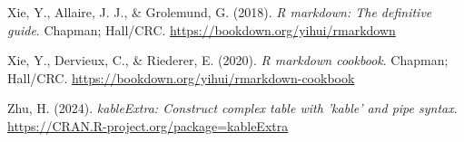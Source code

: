 \documentclass[
  stu]{apa7}
\newlength{\cslhangindent}
\newenvironment{CSLReferences}[2] %
 {\begin{list}{}{%
  \setlength{\itemindent}{0pt}
  \setlength{\leftmargin}{0pt}
  \setlength{\parsep}{0pt}
  \ifodd #1
   \setlength{\leftmargin}{\cslhangindent}
   \setlength{\itemindent}{-1\cslhangindent}
  \fi
  \setlength{\itemsep}{#2\baselineskip}}}
 {\end{list}}
\begin{document}
\begin{CSLReferences}{1}{0}
Xie, Y., Allaire, J. J., \& Grolemund, G. (2018). \emph{R markdown: The definitive guide}. Chapman; Hall/CRC. \url{https://bookdown.org/yihui/rmarkdown}

Xie, Y., Dervieux, C., \& Riederer, E. (2020). \emph{R markdown cookbook}. Chapman; Hall/CRC. \url{https://bookdown.org/yihui/rmarkdown-cookbook}

Zhu, H. (2024). \emph{kableExtra: Construct complex table with 'kable' and pipe syntax}. \url{https://CRAN.R-project.org/package=kableExtra}

\end{CSLReferences}


\clearpage
\renewcommand{\listfigurename}{Figure captions}

\clearpage
\renewcommand{\listtablename}{Table captions}
\end{document}
